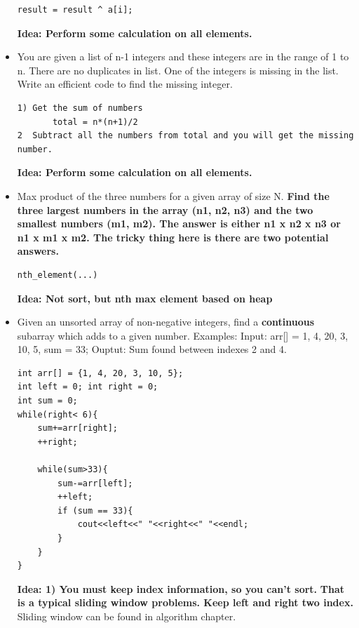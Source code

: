 \documentclass[a4paper,11pt,twoside]{book}
\begin{document}
\begin{itemize}
\begin{lstlisting}[breaklines]
	result = result ^ a[i];
\end{lstlisting}
\textbf{Idea: Perform some calculation on all elements. }


	\item You are given a list of n-1 integers and these integers are in the range of 1 to n. There are no duplicates in list. One of the integers is missing in the list. Write an efficient code to find the missing integer.
\begin{lstlisting}[breaklines]
1) Get the sum of numbers 
       total = n*(n+1)/2
2  Subtract all the numbers from total and you will get the missing number.
\end{lstlisting}
\textbf{Idea: Perform some calculation on all elements. }

	\item Max product of the three numbers for a given array of size N. \textbf{Find the three largest numbers in the array (n1, n2, n3) and the two smallest numbers (m1, m2). The answer is either n1 x n2 x n3 or n1 x m1 x m2. The tricky thing here is there are two potential answers.}
\begin{lstlisting}[breaklines]
nth_element(...)
\end{lstlisting}
\textbf{Idea: Not sort, but nth max element based on heap}

	\item Given an unsorted array of non-negative integers, find a \textbf{continuous} subarray which adds to a given number.  Examples: Input: arr[] = {1, 4, 20, 3, 10, 5}, sum = 33; Ouptut: Sum found between indexes 2 and 4. 

\begin{lstlisting}[breaklines]
int arr[] = {1, 4, 20, 3, 10, 5};
int left = 0; int right = 0;
int sum = 0;
while(right< 6){
	sum+=arr[right];
	++right;
	
	while(sum>33){
		sum-=arr[left];
		++left;
		if (sum == 33){
			cout<<left<<" "<<right<<" "<<endl;
		}
	}	
}
\end{lstlisting}
\textbf{Idea: 1) You must keep index information, so you can't sort. }  \textbf{That is a typical sliding window problems. Keep left and right two index. } Sliding window can be found in algorithm chapter. 


\end{itemize}
\end{document}
